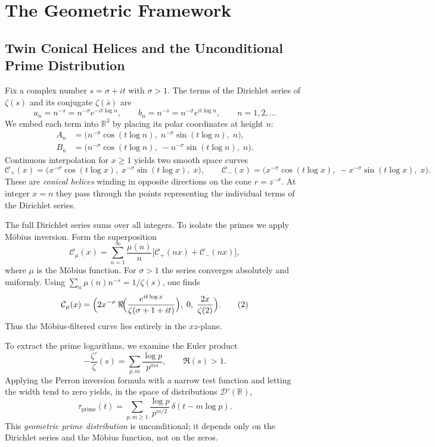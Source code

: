 \documentclass[12pt,a4paper,twoside]{book}
\newcommand{\R}{\mathbb{R}}
\newcommand{\dist}{\mathcal{D}'}
\begin{document}
\chapter{The Geometric Framework}

\section{Twin Conical Helices and the Unconditional Prime Distribution}

Fix a complex number \(s = \sigma + i t\) with \(\sigma > 1\).  The terms of the Dirichlet series of \(\zeta(s)\) and its conjugate \(\zeta(\bar s)\) are
\[
a_n = n^{-s} = n^{-\sigma} e^{-i t \log n},\qquad
b_n = n^{-\bar s} = n^{-\sigma} e^{i t \log n},\qquad n=1,2,\dots
\]
We embed each term into \(\R^3\) by placing its polar coordinates at height \(n\):
\begin{align*}
A_n &= \bigl( n^{-\sigma}\cos(t\log n),\; n^{-\sigma}\sin(t\log n),\; n \bigr),\\
B_n &= \bigl( n^{-\sigma}\cos(t\log n),\; -n^{-\sigma}\sin(t\log n),\; n \bigr).
\end{align*}
Continuous interpolation for \(x\ge 1\) yields two smooth space curves
\begin{equation}\label{conical}
\mathcal{C}_+(x) = \bigl( x^{-\sigma}\cos(t\log x),\; x^{-\sigma}\sin(t\log x),\; x \bigr),\qquad
\mathcal{C}_-(x) = \bigl( x^{-\sigma}\cos(t\log x),\; -x^{-\sigma}\sin(t\log x),\; x \bigr).
\end{equation}
These are \emph{conical helices} winding in opposite directions on the cone \(r = z^{-\sigma}\).  At integer \(x=n\) they pass through the points representing the individual terms of the Dirichlet series.

The full Dirichlet series sums over all integers.  To isolate the primes we apply Möbius inversion.  Form the superposition
\[
\mathcal{C}_\mu(x) = \sum_{n=1}^{\infty} \frac{\mu(n)}{n} \bigl[ \mathcal{C}_+(n x) + \mathcal{C}_-(n x) \bigr],
\]
where \(\mu\) is the Möbius function.  For \(\sigma>1\) the series converges absolutely and uniformly.  Using \(\sum_n \mu(n)n^{-s} = 1/\zeta(s)\), one finds
\[
\mathcal{C}_\mu(x) = \Bigl( 2x^{-\sigma}\,\Re\!\Bigl( \frac{e^{i t\log x}}{\zeta(\sigma+1+it)} \Bigr),\; 0,\; \frac{2x}{\zeta(2)} \Bigr). \tag{2}
\]
Thus the Möbius‑filtered curve lies entirely in the \(xz\)-plane.

To extract the prime logarithms, we examine the Euler product
\[
-\frac{\zeta'}{\zeta}(s) = \sum_{p,m} \frac{\log p}{p^{m s}}, \qquad \Re(s)>1 .
\]
Applying the Perron inversion formula with a narrow test function and letting the width tend to zero yields, in the space of distributions \(\dist(\R)\),
\begin{equation}\label{prime_dist}
\tau_{\text{prime}}(t) = \sum_{p,m\ge 1} \frac{\log p}{p^{m/2}} \, \delta(t - m\log p).
\end{equation}
This \emph{geometric prime distribution} is unconditional; it depends only on the Dirichlet series and the Möbius function, not on the zeros.
\end{document}
